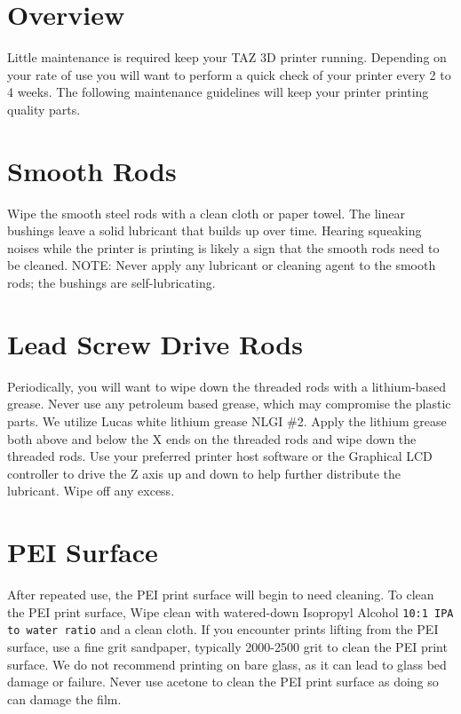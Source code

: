 %
%
%
%
%

\section{Overview}
Little maintenance is required keep your TAZ 3D printer running. Depending on your rate of use you will want to perform a quick check of your printer every 2 to 4 weeks. The following maintenance guidelines will keep your printer printing quality parts.

\section{Smooth Rods}
Wipe the smooth steel rods with a clean cloth or paper towel. The linear bushings leave a solid lubricant that builds up over time. Hearing squeaking noises while the printer is printing is likely a sign that the smooth rods need to be cleaned. NOTE: Never apply any lubricant or cleaning agent to the smooth rods; the bushings are self-lubricating.

\section{Lead Screw Drive Rods}
Periodically, you will want to wipe down the threaded rods with a lithium-based grease. Never use any petroleum based grease, which may compromise the plastic parts. We utilize Lucas white lithium grease NLGI \#2. Apply the lithium grease both above and below the X ends on the threaded rods and wipe down the threaded rods. Use your preferred printer host software or the Graphical LCD controller to drive the Z axis up and down to help further distribute the lubricant. Wipe off any excess.

\section{PEI Surface}
After repeated use, the PEI print surface will begin to need cleaning. To clean the PEI print surface, Wipe clean with watered-down Isopropyl Alcohol \texttt{10:1 IPA to water ratio} and a clean cloth. If you encounter prints lifting from the PEI surface, use a fine grit sandpaper, typically 2000-2500 grit to clean the PEI print surface. We do not recommend printing on bare glass, as it can lead to glass bed damage or failure. Never use acetone to clean the PEI print surface as doing so can damage the film.

